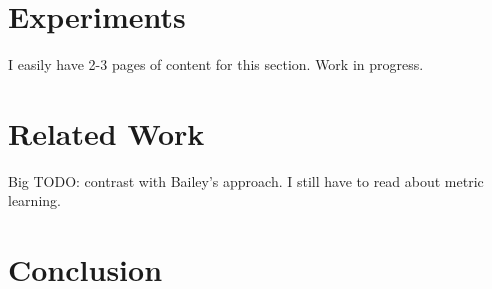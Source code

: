 \section{Experiments}
\label{sec:experiments}
{\color{red} I easily have 2-3 pages of content for this section. Work in
progress.}

\section{Related Work}
\label{sec:related-works}
{\color{red} Big TODO: contrast with Bailey's approach.
I still have to read about metric learning.}


\section{Conclusion}
\label{sec:conclusions}




%
%


